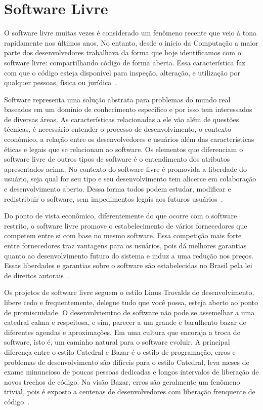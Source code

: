 \chapter[Software Livre]{Software Livre}
\label{software_livre}

O software livre muitas vezes é considerado um fenômeno recente que veio à tona
rapidamente nos últimos anos. No entanto, desde o início da Computação a maior parte
dos desenvolvedores trabalhava da forma que hoje identificamos com o software livre:
compartilhando código de forma aberta. Essa característica 
faz com que o código esteja disponível para inspeção, alteração, e utilização por qualquer
pessoas, física ou jurídica~\cite{kon2012software, Hippel:2003:OSS:970521.970585}.

Software representa uma solução abstrata para problemas do mundo real baseados
em um domínio de conhecimento específico e por isso tem interessados de 
diversas áreas. As características relacionadas a ele vão além de questões
técnicas, é necessário entender o processo de desenvolvimento, o contexto econômico,
a relação entre os desenvolvedores e usuários além das características éticas e
legais que se relacionam ao software.
%
Os elementos que diferenciam o software livre de outros tipos de software 
é o entendimento dos atributos apresentados acima. No contexto do software livre
é promovida a liberdade do usuário, seja qual for seu tipo e seu desenvolvimento
tem alicerce em colaboração e desenvolvimento aberto. Dessa forma todos podem
estudar, modificar e redistribuir o software, sem impedimentos legais aos 
futuros usuários~\cite{meirelles2013metrics}.

Do ponto de vista econômico, diferentemente do que ocorre com o software 
restrito, o software livre promove o estabelecimento
de vários fornecedores que competem entre si com base no mesmo software. Essa competição 
mais forte entre fornecedores traz vantagens para os usuários, pois dá melhores
garantias quanto ao desenvolvimento futuro do sistema e induz a uma redução nos 
preços. Essas liberdades e garantias sobre o software são estabelecidas 
no Brasil pela lei de direitos autorais~\cite{kon2012software}. 

Os projetos de software livre seguem o estilo Linus Trovalds de desenvolvimento, libere
cedo e frequentemente, delegue tudo que você possa, esteja aberto ao ponto de promiscuidade.
O desenvolviemtno de software não pode se assemelhar a uma catedral calma e respeitosa, e sim, 
parecer a um grande e barulhento bazar de diferentes agendas e aproximações. 
Em uma cultura que encoraja a troca de software, isto é, um caminho natural para o software evoluir.
A principal diferença entre o estilo Catedral e Bazar é o estilo de programação, 
erros e problemas de desenvolvimento são difíceis para o estilo Catedral, leva meses 
de exame minuncioso de poucas pessoas dedicadas e longos intervalos de liberação 
de novos trechos de código.
Na visão Bazar, erros são geralmente um fenômeno trivial, pois é exposto a centenas de 
desenvolvedores com liberação frenquente de código~\cite{Raymond:1999:CB:580808}.

